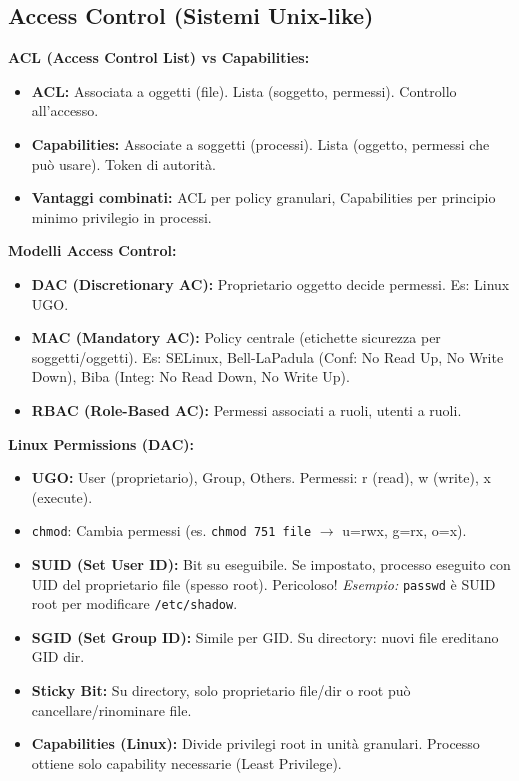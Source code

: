 \documentclass[10pt,a4paper]{article}
\begin{document}
\begin{multicols}{2}
\section*{Access Control (Sistemi Unix-like)}
\textbf{ACL (Access Control List) vs Capabilities:}
\begin{itemize}
    \item \textbf{ACL:} Associata a oggetti (file). Lista (soggetto, permessi). Controllo all'accesso.
    \item \textbf{Capabilities:} Associate a soggetti (processi). Lista (oggetto, permessi che può usare). Token di autorità.
    \item \textbf{Vantaggi combinati:} ACL per policy granulari, Capabilities per principio minimo privilegio in processi.
\end{itemize}
\textbf{Modelli Access Control:}
\begin{itemize}
    \item \textbf{DAC (Discretionary AC):} Proprietario oggetto decide permessi. Es: Linux UGO.
    \item \textbf{MAC (Mandatory AC):} Policy centrale (etichette sicurezza per soggetti/oggetti). Es: SELinux, Bell-LaPadula (Conf: No Read Up, No Write Down), Biba (Integ: No Read Down, No Write Up).
    \item \textbf{RBAC (Role-Based AC):} Permessi associati a ruoli, utenti a ruoli.
\end{itemize}
\textbf{Linux Permissions (DAC):}
\begin{itemize}
    \item \textbf{UGO:} User (proprietario), Group, Others. Permessi: r (read), w (write), x (execute).
    \item \texttt{chmod}: Cambia permessi (es. \texttt{chmod 751 file} $\rightarrow$ u=rwx, g=rx, o=x).
    \item \textbf{SUID (Set User ID):} Bit su eseguibile. Se impostato, processo eseguito con UID del proprietario file (spesso root). Pericoloso!
    \textit{Esempio:} \texttt{passwd} è SUID root per modificare \texttt{/etc/shadow}.
    \item \textbf{SGID (Set Group ID):} Simile per GID. Su directory: nuovi file ereditano GID dir.
    \item \textbf{Sticky Bit:} Su directory, solo proprietario file/dir o root può cancellare/rinominare file.
    \item \textbf{Capabilities (Linux):} Divide privilegi root in unità granulari. Processo ottiene solo capability necessarie (Least Privilege).
\end{itemize}


\end{multicols}
\end{document}
